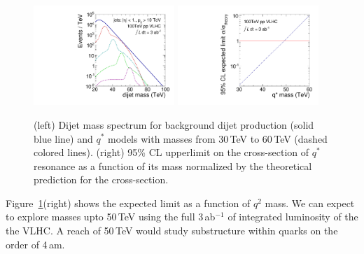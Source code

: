 \begin{figure}
\begin{center}
\includegraphics[width=0.475\textwidth]{QstarVLHC/plots/qstar_100TeV}
\includegraphics[width=0.475\textwidth]{QstarVLHC/plots/qstar_limits}
\end{center}
\caption{\label{fig:qstar_vlhc}(left) Dijet mass spectrum for
  background dijet production (solid blue line) and $q^*$ models with
  masses from 30\,TeV to 60\,TeV (dashed colored lines). (right) 95\%
  CL upperlimit on the cross-section of $q^*$ resonance as a function
  of its mass normalized by the theoretical prediction for the
  cross-section.}
\end{figure}

Figure~\ref{fig:qstar_vlhc}(right) shows the expected limit as a
function of $q^2$ mass.  We can expect to explore masses upto 50\,TeV
using the full 3\,ab$^{-1}$ of integrated luminosity of the the VLHC.
A reach of 50\,TeV would study substructure within quarks on the order
of 4\,am.

